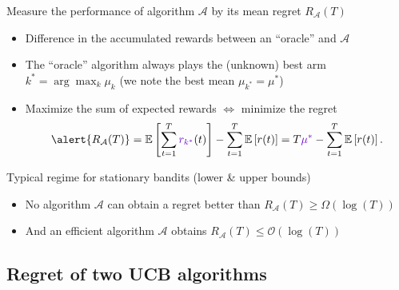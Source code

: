 \documentclass[11pt,english,ignorenonframetext,]{beamer}
\begin{document}
\begin{frame}{Measure the performance of algorithm $\mathcal{A}$ by its mean regret $R_{\mathcal{A}}(T)$}

\begin{itemize}
  \item
  Difference in the accumulated rewards between an ``oracle'' and $\mathcal{A}$

  \item
  The ``oracle'' algorithm always plays \textcolor{deeppurple}{the (unknown) best arm $k^* = \arg\max_k \mu_k$} (we note the best mean \textcolor{deeppurple}{$\mu_{k^*} = \mu^*$})

  \item
  Maximize the sum of expected rewards
  $\Longleftrightarrow$ \alert{minimize the regret}
  \[ \alert{ R_{\mathcal{A}}(T) } = \mathbb{E}\left[ \sum\limits_{t=1}^T \textcolor{deeppurple}{r_{k^*}}(t) \right] - \sum\limits_{t=1}^T \mathbb{E}\left[ r(t) \right] = T \textcolor{deeppurple}{\mu^*} - \sum\limits_{t=1}^T \mathbb{E}\left[ r(t) \right]. \]

\end{itemize}

\pause
\vspace*{10pt}

\begin{exampleblock}{Typical regime for stationary bandits (lower \& upper bounds)}
  \begin{itemize}
  \item
  No algorithm $\mathcal{A}$ can obtain a regret better than
  \hfill{}
  $R_{\mathcal{A}}(T) \geq \Omega(\log(T))$

  \item
  And an efficient algorithm $\mathcal{A}$ obtains
  \hfill{}
  $R_{\mathcal{A}}(T) \leq \mathcal{O}(\log(T))$
  \end{itemize}
\end{exampleblock}

\end{frame}

\subsection{\hfill{}Regret of two UCB algorithms\hfill{}}
\end{document}
